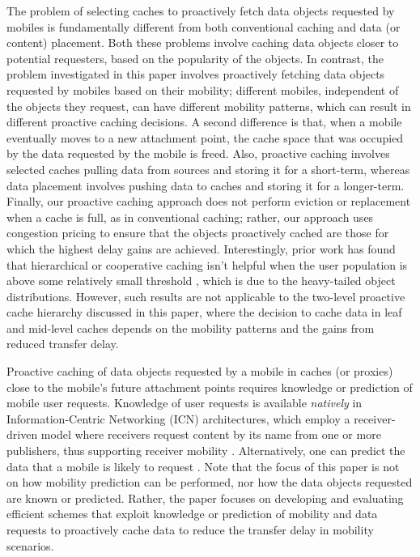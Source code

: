 \documentclass[conference]{IEEEtran}
\begin{document}
The problem of selecting caches to proactively fetch data objects requested by mobiles is fundamentally different from both  conventional caching  and  data (or content) placement. Both these problems involve caching data objects closer to potential requesters, based on the popularity of the objects. In contrast, the  problem investigated in this paper involves proactively fetching data objects  requested by mobiles based on their mobility; different mobiles, independent of the  objects they request, can have different mobility patterns, which can result in different proactive caching decisions. A second difference is that, when a mobile eventually moves to a new  attachment point, the cache space that was occupied by the data requested by the mobile is freed.
Also, proactive caching involves selected caches pulling data from sources and storing it for a short-term, whereas data placement involves pushing data to caches and storing it for a longer-term.
Finally, our proactive caching approach  does not perform eviction or replacement when a cache is full, as in conventional caching; rather, our approach uses congestion pricing to ensure that the objects proactively cached are those for which the highest delay gains are achieved.
Interestingly, prior work has found that  hierarchical or cooperative caching isn't helpful when the user population is above some relatively small threshold \cite{Wol++99}, which is due to the heavy-tailed object distributions. However, such results are not applicable to the two-level proactive cache hierarchy discussed in this paper, where the decision to cache data in  leaf and mid-level caches depends on the mobility patterns and the gains from reduced transfer delay.

Proactive caching of data objects requested by  a mobile  in caches (or proxies) close to the mobile's future  attachment points requires knowledge or prediction of  mobile user requests.
Knowledge of user requests is available \emph{natively}  in Information-Centric Networking (ICN) architectures, which employ a receiver-driven model where receivers request content by its name from one or more publishers, thus supporting receiver mobility \cite{Xyl++12}.
Alternatively, one can predict the data that a mobile is likely to request \cite{Hig++12,Lym++12}.
Note that the focus of this paper is not on how mobility prediction can be performed, nor how the data objects requested are known or predicted. Rather, the paper focuses on developing and evaluating efficient schemes that exploit knowledge or prediction of mobility and data requests  to proactively cache data  to reduce the transfer delay in mobility scenarios.
\end{document}
